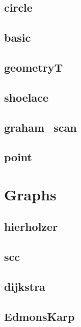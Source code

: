 \subsection{circle}
\raggedbottom
\hrulefill
\subsection{basic}
\raggedbottom
\hrulefill
\subsection{geometryT}
\raggedbottom
\hrulefill
\subsection{shoelace}
\raggedbottom
\hrulefill
\subsection{graham_scan}
\raggedbottom
\hrulefill
\subsection{point}
\raggedbottom
\hrulefill

\section{Graphs}
\subsection{hierholzer}
\raggedbottom
\hrulefill
\subsection{scc}
\raggedbottom
\hrulefill
\subsection{dijkstra}
\raggedbottom
\hrulefill
\subsection{EdmonsKarp}
\raggedbottom
\hrulefill
